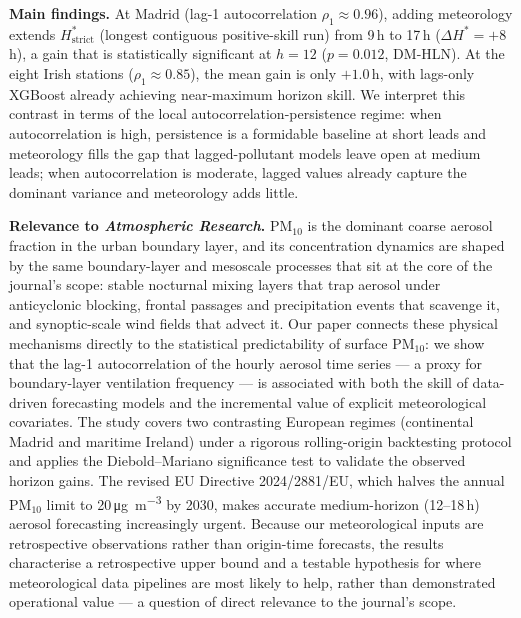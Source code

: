 \documentclass[12pt,a4paper]{article}
\begin{document}

\textbf{Main findings.}
At Madrid (lag-1 autocorrelation $\rho_1 \approx 0.96$), adding meteorology
extends $H^*_{\text{strict}}$ (longest contiguous positive-skill run) from
9\,h to 17\,h ($\Delta H^* = +8$\,h), a gain that is statistically significant
at $h = 12$ ($p = 0.012$, DM-HLN).  At the eight Irish stations
($\rho_1 \approx 0.85$), the mean gain is only $+1.0$\,h, with lags-only
XGBoost already achieving near-maximum horizon skill.  We interpret this
contrast in terms of the local autocorrelation-persistence
regime: when autocorrelation is high, persistence is a formidable baseline at
short leads and meteorology fills the gap that lagged-pollutant models leave
open at medium leads; when autocorrelation is moderate, lagged values already
capture the dominant variance and meteorology adds little.


\textbf{Relevance to \textit{Atmospheric Research}.}
PM$_{10}$ is the dominant coarse aerosol fraction in the urban boundary layer,
and its concentration dynamics are shaped by the same boundary-layer and
mesoscale processes that sit at the core of the journal's scope: stable
nocturnal mixing layers that trap aerosol under anticyclonic blocking,
frontal passages and precipitation events that scavenge it, and synoptic-scale
wind fields that advect it.  Our paper connects these physical mechanisms
directly to the statistical predictability of surface PM$_{10}$: we show that
the lag-1 autocorrelation of the hourly aerosol time series — a proxy for
boundary-layer ventilation frequency — is associated with both the skill of
data-driven forecasting models and the incremental value of explicit
meteorological covariates.  The study covers two contrasting European regimes (continental
Madrid and maritime Ireland) under a rigorous rolling-origin backtesting
protocol and applies the Diebold--Mariano significance test to validate the
observed horizon gains.  The revised EU Directive 2024/2881/EU, which halves
the annual PM$_{10}$ limit to 20\,\si{\micro\gram\per\cubic\metre} by 2030,
makes accurate medium-horizon (12--18\,h) aerosol forecasting increasingly
urgent.  Because our meteorological inputs are retrospective observations rather
than origin-time forecasts, the results characterise a retrospective upper bound
and a testable hypothesis for where meteorological data pipelines are most likely
to help, rather than demonstrated operational value — a question of direct
relevance to the journal's scope.
\end{document}

